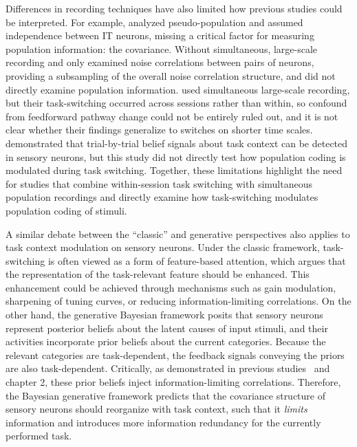 \documentclass[lineno,pdflatex,sn-basic]{sn-jnl}%
\theoremstyle{thmstyleone}%
\theoremstyle{thmstyletwo}%
\theoremstyle{thmstylethree}%
\begin{document}
Differences in recording techniques have also limited how previous studies could be interpreted. For example, \citet{tajima2017task} analyzed pseudo-population and assumed independence between IT neurons, missing a critical factor for measuring population information: the covariance. Without simultaneous, large-scale recording \citet{downer2017feature} and \citet{cohen2008context} only examined noise correlations between pairs of neurons, providing a subsampling of the overall noise correlation structure, and did not directly examine population information. \citet{bondy2018feedback}  used simultaneous large-scale recording, but their task-switching occurred across sessions rather than within, so confound from feedforward pathway change could not be entirely ruled out, and it is not clear whether their findings generalize to switches on shorter time scales.  \citet{xue2022dynamic} demonstrated that trial-by-trial belief signals about task context can be detected in sensory neurons, but this study did not directly test how population coding is modulated during task switching. Together, these limitations highlight the need for studies that combine within-session task switching with simultaneous population recordings and directly examine how task-switching modulates population coding of stimuli.

A similar debate between the ``classic'' and generative perspectives also applies to task context modulation on sensory neurons. Under the classic framework, task-switching is often viewed as a form of feature-based attention, which argues that the representation of the task-relevant feature should be enhanced. This enhancement could be achieved through mechanisms such as gain modulation, sharpening of tuning curves, or reducing information-limiting correlations. On the other hand, the generative Bayesian framework posits that sensory neurons represent posterior beliefs about the latent causes of input stimuli, and their activities incorporate prior beliefs about the current categories. Because the relevant categories are task-dependent, the feedback signals conveying the priors are also task-dependent. Critically, as demonstrated in previous studies~\citep{lange2022task} and chapter 2, these prior beliefs inject information-limiting correlations. Therefore, the Bayesian generative framework predicts that the covariance structure of sensory neurons should reorganize with task context, such that it \emph{limits} information and introduces more information redundancy for the currently performed task. 
\end{document}
